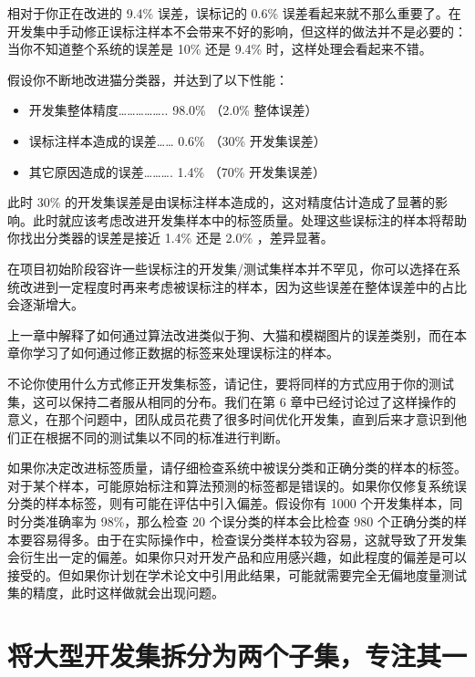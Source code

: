 相对于你正在改进的 9.4\% 误差，误标记的 0.6\%
误差看起来就不那么重要了。在开发集中手动修正误标注样本不会带来不好的影响，但这样的做法并不是必要的：当你不知道整个系统的误差是
10\% 还是 9.4\% 时，这样处理会看起来不错。

假设你不断地改进猫分类器，并达到了以下性能：

\begin{itemize}
\tightlist
\item
  开发集整体精度\ldots\ldots\ldots\ldots\ldots.. 98.0\% （2.0\%
  整体误差）
\item
  误标注样本造成的误差\ldots\ldots{} 0.6\% （30\% 开发集误差）
\item
  其它原因造成的误差\ldots\ldots\ldots. 1.4\% （70\% 开发集误差）
\end{itemize}

此时 30\%
的开发集误差是由误标注样本造成的，这对精度估计造成了显著的影响。此时就应该考虑改进开发集样本中的标签质量。处理这些误标注的样本将帮助你找出分类器的误差是接近
1.4\% 还是 2.0\% ，差异显著。

在项目初始阶段容许一些误标注的开发集/测试集样本并不罕见，你可以选择在系统改进到一定程度时再来考虑被误标注的样本，因为这些误差在整体误差中的占比会逐渐增大。

上一章中解释了如何通过算法改进类似于狗、大猫和模糊图片的误差类别，而在本章你学习了如何通过修正数据的标签来处理误标注的样本。

不论你使用什么方式修正开发集标签，请记住，要将同样的方式应用于你的测试集，这可以保持二者服从相同的分布。我们在第
6
章中已经讨论过了这样操作的意义，在那个问题中，团队成员花费了很多时间优化开发集，直到后来才意识到他们正在根据不同的测试集以不同的标准进行判断。

如果你决定改进标签质量，请仔细检查系统中被误分类和正确分类的样本的标签。对于某个样本，可能原始标注和算法预测的标签都是错误的。如果你仅修复系统误分类的样本标签，则有可能在评估中引入偏差。假设你有
1000 个开发集样本，同时分类准确率为 98\%，那么检查 20
个误分类的样本会比检查 980
个正确分类的样本要容易得多。由于在实际操作中，检查误分类样本较为容易，这就导致了开发集会衍生出一定的偏差。如果你只对开发产品和应用感兴趣，如此程度的偏差是可以接受的。但如果你计划在学术论文中引用此结果，可能就需要完全无偏地度量测试集的精度，此时这样做就会出现问题。

\hypertarget{ux5c06ux5927ux578bux5f00ux53d1ux96c6ux62c6ux5206ux4e3aux4e24ux4e2aux5b50ux96c6ux4e13ux6ce8ux5176ux4e00}{%
\chapter{将大型开发集拆分为两个子集，专注其一}\label{ux5c06ux5927ux578bux5f00ux53d1ux96c6ux62c6ux5206ux4e3aux4e24ux4e2aux5b50ux96c6ux4e13ux6ce8ux5176ux4e00}}


